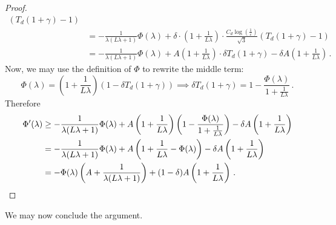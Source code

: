 \documentclass{theoretics}
\renewcommand{\epsilon}{\varepsilon}
\begin{document}
\begin{proof}
\begin{align*}
                \left(T_d(1+\gamma) - 1\right) \\
        &= -\frac{1}{\lambda (L\lambda+1)} \Phi(\lambda)
            + \delta \cdot
            \left(1 + \frac{1}{L \lambda}\right) \cdot
                \frac{C_d \log \left(\frac{1}{\epsilon} \right)}{\sqrt{3}}
                \left(T_d(1+\gamma) - 1\right) \\
        &= -\frac{1}{\lambda (L\lambda+1)} \Phi(\lambda)
            + A \left(1 + \frac{1}{L \lambda}\right) \cdot \delta T_d(1+\gamma)
            - \delta A \left(1 + \frac{1}{L \lambda}\right) \,.
    \end{align*}
    Now, we may use the definition of $\Phi$ to rewrite the middle term:
    \[
        \Phi(\lambda) =
        \left(1 + \frac{1}{L \lambda}\right) \left(1 - \delta T_d(1 + \gamma)\right)
        \implies
        \delta T_d(1 + \gamma)
        = 1 - \frac{\Phi(\lambda)}{1 + \frac{1}{L \lambda}} \,.
    \]
    Therefore
    \begin{align*}
        \Phi'(\lambda)
        &\ge -\frac{1}{\lambda (L\lambda+1)} \Phi(\lambda)
            + A \left(1 + \frac{1}{L \lambda}\right)
                \left( 1 - \frac{\Phi(\lambda)}{1 + \frac{1}{L \lambda}} \right)
            - \delta A \left(1 + \frac{1}{L \lambda}\right) \\
        &= -\frac{1}{\lambda (L\lambda+1)} \Phi(\lambda)
            + A \left( 1 + \frac{1}{L\lambda} - \Phi(\lambda) \right)
            - \delta A \left(1 + \frac{1}{L \lambda}\right) \\
        &= -\Phi(\lambda) \left( A + \frac{1}{\lambda (L\lambda+1)} \right)
            + (1-\delta) A \left( 1 + \frac{1}{L\lambda} \right) \,. \qedhere
    \end{align*}
\end{proof}

We may now conclude the argument.
\end{document}
